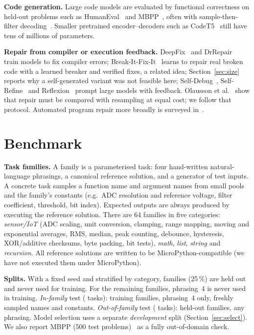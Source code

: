 \textbf{Code generation.} Large code models are evaluated by functional correctness on held-out problems such as HumanEval~\cite{chen2021codex} and MBPP~\cite{austin2021mbpp}, often with sample-then-filter decoding~\cite{li2022alphacode}. Smaller pretrained encoder--decoders such as CodeT5~\cite{wang2021codet5} still have tens of millions of parameters.

\textbf{Repair from compiler or execution feedback.} DeepFix~\cite{gupta2017deepfix} and DrRepair~\cite{yasunaga2020drrepair} train models to fix compiler errors; Break-It-Fix-It~\cite{yasunaga2021bifi} learns to repair real broken code with a learned breaker and verified fixes, a related idea; Section~\ref{sec:size} reports why a self-generated variant was not feasible here; Self-Debug~\cite{chen2024selfdebug}, Self-Refine~\cite{madaan2023selfrefine} and Reflexion~\cite{shinn2023reflexion} prompt large models with feedback. Olausson et al.~\cite{olausson2024selfrepair} show that repair must be compared with resampling at equal cost; we follow that protocol. Automated program repair more broadly is surveyed in~\cite{legoues2019apr}.

\section{Benchmark}\label{sec:bench}
\textbf{Task families.} A family is a parameterised task: four hand-written natural-language phrasings, a canonical reference solution, and a generator of test inputs. A concrete task samples a function name and argument names from small pools and the family's constants (e.g.\ ADC resolution and reference voltage, filter coefficient, threshold, bit index). Expected outputs are always produced by executing the reference solution. There are 64 families in five categories: \emph{sensor/IoT} (ADC scaling, unit conversion, clamping, range mapping, moving and exponential averages, RMS, median, peak counting, debounce, hysteresis, XOR/additive checksums, byte packing, bit tests), \emph{math}, \emph{list}, \emph{string} and \emph{recursion}. All reference solutions are written to be MicroPython-compatible (we have not executed them under MicroPython).

\textbf{Splits.} With a fixed seed and stratified by category, \nfamheld{} families (25\,\%) are held out and never used for training. For the remaining \nfamtrain{} families, phrasing~4 is never used in training. \emph{In-family} test (\ntestid{} tasks): training families, phrasing~4 only, freshly sampled names and constants. \emph{Out-of-family} test (\ntestood{} tasks): held-out families, any phrasing. Model selection uses a separate \emph{development} split (Section~\ref{sec:select}). We also report MBPP (500 test problems)~\cite{austin2021mbpp} as a fully out-of-domain check.


